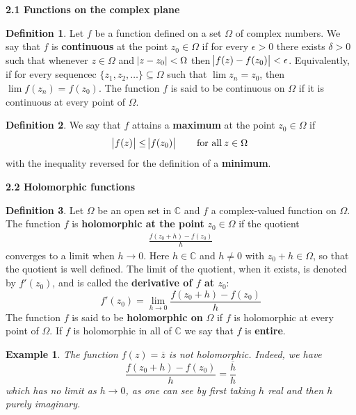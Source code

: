 \documentclass{article}
\newtheorem*{example}{Example}
\theoremstyle{definition}
\newtheorem{definition}{Definition}[section]
\theoremstyle{remark}
\begin{document}
    \newpage

    \textbf{2.1 Functions on the complex plane}
    \begin{definition}
        Let $f$ be a function defined on a set $\Omega$ of complex numbers. We say that $f$ is \textbf{continuous} at the point
        $z_0\in\Omega$ if for every $\epsilon>0$ there exists $\delta>0$ such that whenever $z\in\Omega$ and $\abs{z-z_0}<\Omega$
        then $\abs{f(z)-f(z_0)}<\epsilon$. Equivalently, if for every sequencec $\{z_1,z_2,\hdots\}\subseteq\Omega$ such that
        $\lim z_n = z_0$, then $\lim f(z_n) = f(z_0)$. The function $f$ is said to be continuous on $\Omega$ if it is continuous
        at every point of $\Omega$.
    \end{definition}

    \begin{definition}
        We say that $f$ attains a \textbf{maximum} at the point $z_0\in\Omega$ if
        \[ \abs{f(z)} \leq \abs{f(z_0)}\qquad\text{for all}\:z\in\Omega \]
        with the inequality reversed for the definition of a \textbf{minimum}.
    \end{definition}

    \textbf{2.2 Holomorphic functions}
    \begin{definition}
        Let $\Omega$ be an open set in $\mathbb{C}$ and $f$ a complex-valued function on $\Omega$. The function $f$ is 
        \textbf{holomorphic at the point} $z_0\in\Omega$ if the quotient
        \begin{align}
            \frac{f(z_0+h)-f(z_0)}{h}
        \end{align}
        converges to a limit when $h\to0$. Here $h\in\mathbb{C}$ and $h\neq 0$ with $z_0+h\in\Omega$, so that the quotient is well
        defined. The limit of the quotient, when it exists, is denoted by $f'(z_0)$, and is called the \textbf{derivative 
            of $f$ at $z_0$}:
        \[ f'(z_0) = \lim_{h\to0} \frac{f(z_0+h)-f(z_0)}{h} \]
        The function $f$ is said to be \textbf{holomorphic on} $\Omega$ if $f$ is holomorphic at every point of $\Omega$. If
        $f$ is holomorphic in all of $\mathbb{C}$ we say that $f$ is \textbf{entire}.
    \end{definition}

    \begin{example}
        The function $f(z)=\overline{z}$ is not holomorphic. Indeed, we have
        \[ \frac{f(z_0+h)-f(z_0)}{h} = \frac{\overline{h}}{h} \]
        which has no limit as $h\to 0$, as one can see by first taking $h$ real and then $h$ purely imaginary.
    \end{example}
\end{document}
